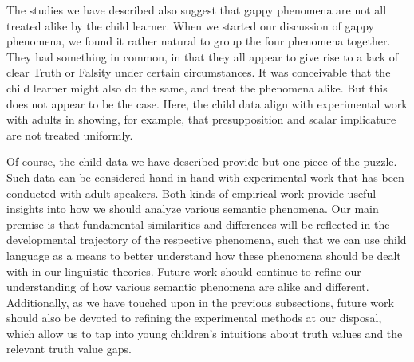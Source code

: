 \documentclass[12pt, letterpaper]{article}
\begin{document}
{The studies we have described also suggest that gappy phenomena are not all treated alike by the child learner. When we started our discussion of gappy phenomena, we found it rather natural to group the four phenomena together. They had something in common, in that they all appear to give rise to a lack of clear Truth or Falsity under certain circumstances. It was conceivable that the child learner might also do the same, and treat the phenomena alike. But this does not appear to be the case. Here, the child data align with experimental work with adults in showing, for example, that presupposition and scalar implicature are not treated uniformly.

Of course, the child data we have described provide but one piece of the puzzle. Such data can be considered hand in hand with experimental work that has been conducted with adult speakers. Both kinds of empirical work provide useful insights into how we should analyze various semantic phenomena. Our main premise is that fundamental similarities and differences will be reflected in the developmental trajectory of the respective phenomena, such that we can use child language as a means to better understand how these phenomena should be dealt with in our linguistic theories. 
Future work should continue to refine our understanding of how various semantic phenomena are alike and different. Additionally, as we have touched upon in the previous subsections, future work should also be devoted to refining the experimental methods at our disposal, which allow us to tap into young children's intuitions about truth values and the relevant truth value gaps. 







}
\end{document}
